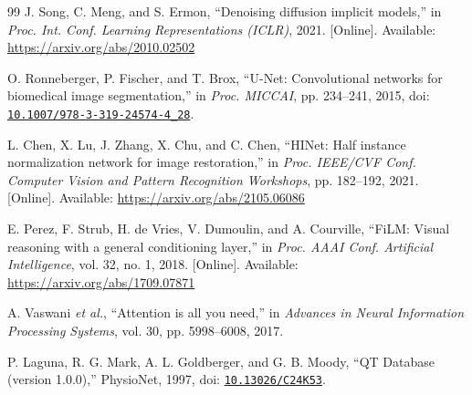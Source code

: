\documentclass[conference]{IEEEtran}
\begin{document}
\begin{thebibliography}{99}
J. Song, C. Meng, and S. Ermon, ``Denoising diffusion implicit models,'' in \textit{Proc. Int. Conf. Learning Representations (ICLR)}, 2021. [Online]. Available: \url{https://arxiv.org/abs/2010.02502}

O. Ronneberger, P. Fischer, and T. Brox, ``U-Net: Convolutional networks for biomedical image segmentation,'' in \textit{Proc. MICCAI}, pp. 234--241, 2015, doi: \href{https://doi.org/10.1007/978-3-319-24574-4_28}{\nolinkurl{10.1007/978-3-319-24574-4_28}}.

L. Chen, X. Lu, J. Zhang, X. Chu, and C. Chen, ``HINet: Half instance normalization network for image restoration,'' in \textit{Proc. IEEE/CVF Conf. Computer Vision and Pattern Recognition Workshops}, pp. 182--192, 2021. [Online]. Available: \url{https://arxiv.org/abs/2105.06086}

E. Perez, F. Strub, H. de Vries, V. Dumoulin, and A. Courville, ``FiLM: Visual reasoning with a general conditioning layer,'' in \textit{Proc. AAAI Conf. Artificial Intelligence}, vol. 32, no. 1, 2018. [Online]. Available: \url{https://arxiv.org/abs/1709.07871}

A. Vaswani \textit{et al.}, ``Attention is all you need,'' in \textit{Advances in Neural Information Processing Systems}, vol. 30, pp. 5998--6008, 2017.

P. Laguna, R. G. Mark, A. L. Goldberger, and G. B. Moody, ``QT Database (version 1.0.0),'' PhysioNet, 1997, doi: \href{https://doi.org/10.13026/C24K53}{\nolinkurl{10.13026/C24K53}}.

\end{thebibliography}
\end{document}
